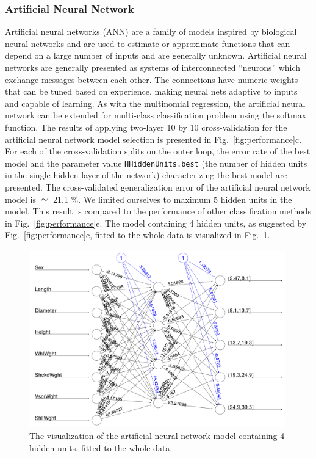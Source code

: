 \documentclass[10pt, paper=a4]{article}
\begin{document}
\subsubsection{Artificial Neural Network}  %
Artificial neural networks (ANN) are a family of models inspired by
biological neural networks and are used to estimate or approximate
functions that can depend on a large number of inputs and are
generally unknown.  Artificial neural networks are generally presented
as systems of interconnected ``neurons'' which exchange messages
between each other.  The connections have numeric weights that can be
tuned based on experience, making neural nets adaptive to inputs and
capable of learning.  As with the multinomial regression, the
artificial neural network can be extended for multi-class
classification problem using the softmax function.  The results of
applying two-layer 10 by 10 cross-validation for the artificial neural
network model selection is presented in Fig.~\ref{fig:performance}c.
For each of the cross-validation splits on the outer loop, the error
rate of the best model and the parameter value
\verb|HHiddenUnits.best| (the number of hidden units in the single
hidden layer of the network) characterizing the best model are
presented.  The cross-validated generalization error of the artificial
neural network model is $\simeq$ 21.1 \%.  We limited ourselves to
maximum 5 hidden units in the model. This result is compared to the
performance of other classification methods in
Fig.~\ref{fig:performance}e.  The model containing 4 hidden units, as
suggested by Fig.~\ref{fig:performance}c, fitted to the whole data is
visualized in Fig.~\ref{fig:ANN}.

\begin{figure}[h!]
  \centering
  \begin{minipage}{0.45\textwidth}
    \includegraphics[width = 0.99\textwidth]{ANN.png}
  \end{minipage} \vfill
  \caption{The visualization of the artificial neural network model
    containing 4 hidden units, fitted to the whole data.}
  \label{fig:ANN}
\end{figure}
\end{document}
